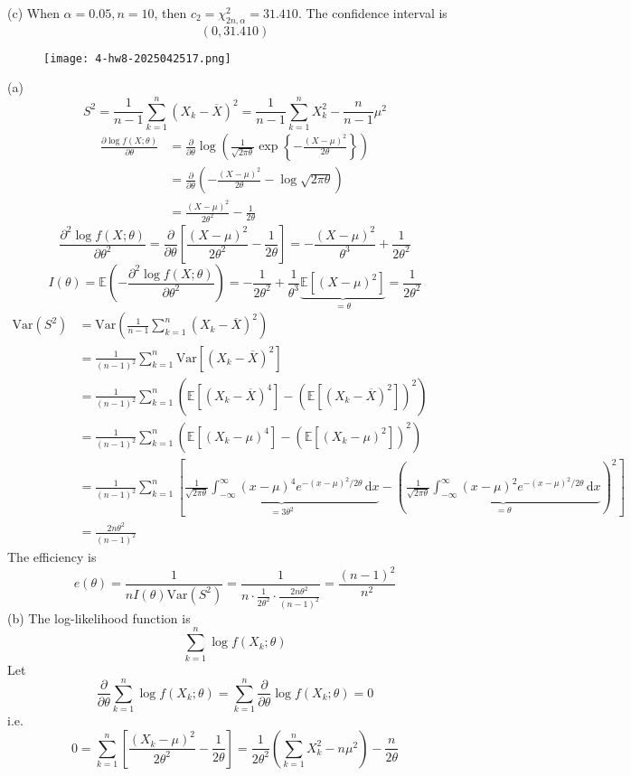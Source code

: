 (c)
When $\alpha=0.05, n=10$, then $c_2=\chi^{2}_{2n,\alpha}=31.410$. The confidence interval is
\[
(0,31.410)
\]
\begin{exercise}
\begin{figure}[H]
\centering
\texttt{[image: 4-hw8-2025042517.png]}
\label{}
\end{figure}
\end{exercise}
(a)
\[
S^2=\frac{1}{n-1}\sum_{k=1}^{n} (X_k-\overline{X})^2=\frac{1}{n-1}\sum_{k=1}^{n} X_k^2-\frac{n}{n-1}\mu^{2}
\]
\[
\begin{aligned}
\frac{ \partial \log f(X;\theta) }{ \partial \theta }  & =\frac{ \partial   }{ \partial \theta } \log\left( \frac{1}{\sqrt{ 2\pi \theta }}\exp \left\{  -\frac{(X-\mu)^2}{2\theta}  \right\} \right) \\
 & =\frac{ \partial   }{ \partial \theta } \left( -\frac{(X-\mu)^2}{2\theta}-\log \sqrt{ 2\pi\theta } \right) \\
 & =\frac{(X-\mu)^2}{2\theta^{2}}-\frac{1}{2\theta} 
\end{aligned}
\]
\[
\frac{ \partial^2 \log f(X;\theta) }{ \partial \theta ^2 }=\frac{ \partial   }{ \partial \theta } \left[ \frac{(X-\mu)^2}{2\theta^{2}}-\frac{1}{2\theta} \right]=-\frac{(X-\mu)^2}{\theta^{3}}+\frac{1}{2\theta^{2}}
\]
\[
I(\theta)=\mathbb{E}\left( -\frac{ \partial^2 \log f(X;\theta) }{ \partial \theta ^2 }  \right)=-\frac{1}{2\theta^{2}}+\frac{1}{\theta^{3}}\underbrace{ \mathbb{E}[(X-\mu)^2] }_{ =\theta }=\frac{1}{2\theta^{2}}
\]
\[
\begin{aligned}
\mathrm{Var}(S^2) & =\mathrm{Var}\left( \frac{1}{n-1}\sum_{k=1}^{n} (X_k-\overline{X})^2 \right) \\
 & =\frac{1}{(n-1)^2}\sum_{k=1}^{n} \mathrm{Var}[(X_k-\overline{X})^2] \\
 & =\frac{1}{(n-1)^2}\sum_{k=1}^{n} (\mathbb{E}[(X_k-\overline{X})^{4}]-(\mathbb{E}[(X_k-\overline{X})^2])^2) \\
 & =\frac{1}{(n-1)^2}\sum_{k=1}^{n} (\mathbb{E}[(X_k-\mu)^{4}]-(\mathbb{E}[(X_k-\mu)^2])^2)  \\
 & =\frac{1}{(n-1)^2}\sum_{k=1}^{n} \left[ \underbrace{ \frac{1}{\sqrt{ 2\pi\theta }}\int_{-\infty}^{\infty} (x-\mu)^{4}e^{ -(x-\mu)^2/2\theta } \, \mathrm{d}x }_{ =3\theta^{2} }  -\left(\underbrace{  \frac{1}{\sqrt{ 2\pi\theta }}\int_{-\infty}^{\infty } (x-\mu)^2e^{ -(x-\mu)^2/2\theta } \, \mathrm{d}x   }_{ =\theta }\right)^2 \right] \\
 & =\frac{2n\theta^{2}}{(n-1)^2}
\end{aligned}
\]
The efficiency is
\[
e(\theta)=\frac{1}{nI(\theta)\mathrm{Var}(S^2)}=\frac{1}{n \cdot\frac{1}{2\theta^{2}}\cdot\frac{2n\theta^{2}}{(n-1)^2}}=\frac{(n-1)^2}{n^2}
\]
(b)
The log-likelihood function is
\[
\sum_{k=1}^{n} \log f(X_k;\theta)
\]
Let
\[
\frac{ \partial   }{ \partial \theta } \sum_{k=1}^{n} \log f(X_k;\theta)=\sum_{k=1}^{n} \frac{ \partial   }{ \partial \theta } \log f(X_k;\theta)=0
\]
i.e.
\begin{equation}
0=\sum_{k=1}^{n}\left[  \frac{(X_k-\mu)^2}{2\theta^{2}}-\frac{1}{2\theta}  \right]=\frac{1}{2\theta^{2}}\left( \sum_{k=1}^{n} X_k^2-n\mu^{2} \right)-\frac{n}{2\theta}
\label{51d91f}
\end{equation}

